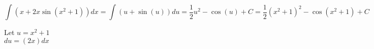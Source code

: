 \documentclass[12pt]{article}
\begin{document}
\begin{enumerate}
\begin{enumerate}
	$$\displaystyle \int (x+2x\sin(x^2+1)) dx = \int (u+\sin(u)) du =\frac{1}{2} u^2-\cos(u)+C=\frac{1}{2} (x^2+1)^2-\cos(x^2+1)+C$$
	
	Let $u=x^2+1$\\
	\quad $du=(2x)dx$
	\end{enumerate}
\end{enumerate}
\end{document}
